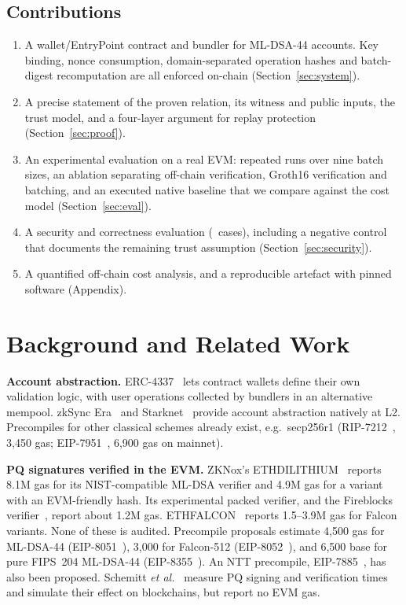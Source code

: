 \documentclass[conference]{IEEEtran}
\begin{document}
\subsection{Contributions}
\begin{enumerate}
\item A wallet/EntryPoint contract and bundler for ML-DSA-44 accounts. Key binding, nonce consumption, domain-separated operation hashes and batch-digest recomputation are all enforced on-chain (Section~\ref{sec:system}).
\item A precise statement of the proven relation, its witness and public inputs, the trust model, and a four-layer argument for replay protection (Section~\ref{sec:proof}).
\item An experimental evaluation on a real EVM: repeated runs over nine batch sizes, an ablation separating off-chain verification, Groth16 verification and batching, and an executed native baseline that we compare against the cost model (Section~\ref{sec:eval}).
\item A security and correctness evaluation (\SecCases\ cases), including a negative control that documents the remaining trust assumption (Section~\ref{sec:security}).
\item A quantified off-chain cost analysis, and a reproducible artefact with pinned software (Appendix).
\end{enumerate}

\section{Background and Related Work}\label{sec:related}

\textbf{Account abstraction.} ERC-4337~\cite{eip4337} lets contract wallets define their own validation logic, with user operations collected by bundlers in an alternative mempool. zkSync Era~\cite{zksync2026aa} and Starknet~\cite{starknet2026accounts} provide account abstraction natively at L2. Precompiles for other classical schemes already exist, e.g.\ secp256r1 (RIP-7212~\cite{rip7212}, 3,450 gas; EIP-7951~\cite{eip7951}, 6,900 gas on mainnet).

\textbf{PQ signatures verified in the EVM.} ZKNox's ETHDILITHIUM~\cite{zknox2026ethdilithium} reports 8.1M gas for its NIST-compatible ML-DSA verifier and 4.9M gas for a variant with an EVM-friendly hash. Its experimental packed verifier, and the Fireblocks verifier~\cite{fireblocks2026evmmldsa}, report about 1.2M gas. ETHFALCON~\cite{zknox2026ethfalcon} reports 1.5--3.9M gas for Falcon variants. None of these is audited. Precompile proposals estimate 4,500 gas for ML-DSA-44 (EIP-8051~\cite{eip8051}), 3,000 for Falcon-512 (EIP-8052~\cite{eip8052}), and 6,500 base for pure FIPS~204 ML-DSA-44 (EIP-8355~\cite{eip8355}). An NTT precompile, EIP-7885~\cite{eip7885}, has also been proposed. Schemitt \emph{et al.}~\cite{schemitt2025assessing} measure PQ signing and verification times and simulate their effect on blockchains, but report no EVM gas.
\end{document}
